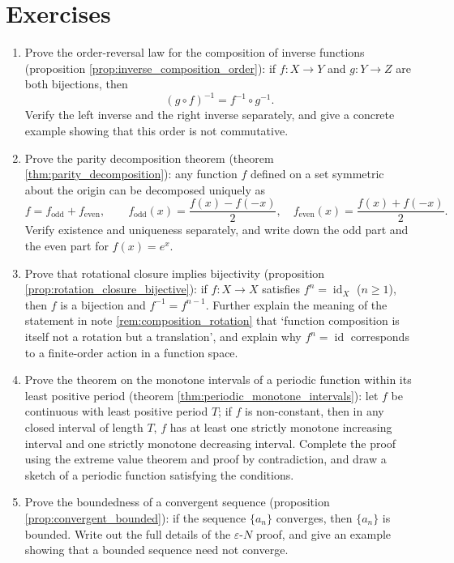 \section*{Exercises}

\begin{enumerate}[leftmargin=3em, label=\textbf{Exercise \arabic*}]
    \item Prove the order-reversal law for the composition of inverse functions (proposition \ref{prop:inverse_composition_order}):
    if $f:X\to Y$ and $g:Y\to Z$ are both bijections, then
    \[
    (g\circ f)^{-1}=f^{-1}\circ g^{-1}.
    \]
    Verify the left inverse and the right inverse separately, and give a concrete example showing that this order is not commutative.

    \item Prove the parity decomposition theorem (theorem \ref{thm:parity_decomposition}):
    any function $f$ defined on a set symmetric about the origin can be decomposed uniquely as
    \[
    f=f_{\text{odd}}+f_{\text{even}},\qquad
    f_{\text{odd}}(x)=\frac{f(x)-f(-x)}{2},\quad
    f_{\text{even}}(x)=\frac{f(x)+f(-x)}{2}.
    \]
    Verify existence and uniqueness separately, and write down the odd part and the even part for $f(x)=e^x$.

    \item Prove that rotational closure implies bijectivity (proposition \ref{prop:rotation_closure_bijective}):
    if $f:X\to X$ satisfies $f^n=\operatorname{id}_X$ ($n\ge1$),
    then $f$ is a bijection and $f^{-1}=f^{n-1}$.
    Further explain the meaning of the statement in note \ref{rem:composition_rotation} that `function composition is itself not a rotation but a translation',
    and explain why $f^n=\operatorname{id}$ corresponds to a finite-order action in a function space.

    \item Prove the theorem on the monotone intervals of a periodic function within its least positive period (theorem \ref{thm:periodic_monotone_intervals}):
    let $f$ be continuous with least positive period $T$; if $f$ is non-constant,
    then in any closed interval of length $T$, $f$ has at least one strictly monotone increasing interval and one strictly monotone decreasing interval.
    Complete the proof using the extreme value theorem and proof by contradiction, and draw a sketch of a periodic function satisfying the conditions.

    \item Prove the boundedness of a convergent sequence (proposition \ref{prop:convergent_bounded}):
    if the sequence $\{a_n\}$ converges, then $\{a_n\}$ is bounded.
    Write out the full details of the $\varepsilon$-$N$ proof, and give an example showing that a bounded sequence need not converge.


\end{enumerate}
